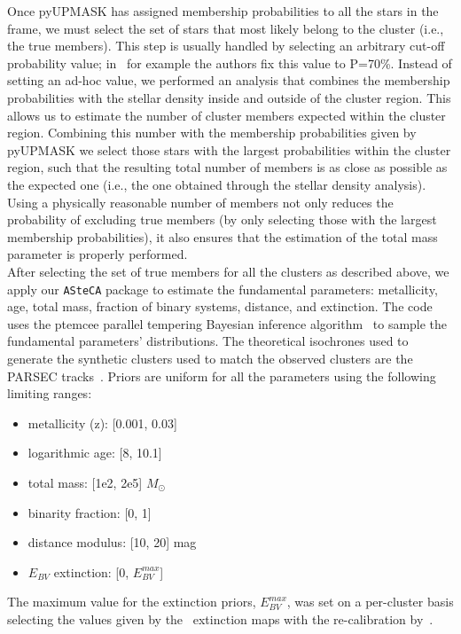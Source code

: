 \documentclass[draft]{aa}
\begin{document}
  Once pyUPMASK has assigned membership probabilities to all the stars in the
  frame, we must select the set of stars that most likely belong to the
  cluster (i.e., the true members). This step is usually handled by selecting
  an arbitrary cut-off probability value; in~\cite{Cantat_2020} for example
  the authors fix this value to P=70\%. Instead of setting an ad-hoc value, we
  performed an analysis that combines the membership probabilities with the
  stellar density inside and outside of the cluster region. This allows us to
  estimate the number of cluster members expected within the cluster region.
  Combining this number with the membership probabilities given by pyUPMASK we
  select those stars with the largest probabilities within the cluster region,
  such that the resulting total number of members is as close as possible as the
  expected one (i.e., the one obtained through the stellar density analysis).
  Using a physically reasonable number of members not only reduces the
  probability of excluding true members (by only selecting those with the
  largest membership probabilities), it also ensures that the estimation of the
  total mass parameter is properly performed.\\

  After selecting the set of true members for all the clusters as described
  above, we apply our \texttt{ASteCA} package to estimate the fundamental
  parameters: metallicity, age, total mass, fraction of binary systems,
  distance, and extinction. The code uses the ptemcee parallel tempering
  Bayesian inference algorithm~\citep{ptemcee} to sample the fundamental
  parameters' distributions. The theoretical isochrones used to generate the
  synthetic clusters used to match the observed clusters are the PARSEC
  tracks~\citep{Bressan_2012}. Priors are uniform for all the parameters using
  the following limiting ranges:

  \begin{itemize}
   \item metallicity (z): [0.001, 0.03]
   \item logarithmic age: [8, 10.1]
   \item total mass: [1e2, 2e5] $M_{\odot}$
   \item binarity fraction: [0, 1]
   \item distance modulus: [10, 20] mag
   \item $E_{BV}$ extinction: [0, $E_{BV}^{max}$]
  \end{itemize}

  \noindent The maximum value for the extinction priors, $E_{BV}^{max}$, was set
  on a per-cluster basis selecting the values given by the~\cite{Schlegel_1998}
  extinction maps with the re-calibration by~\cite{Schlafly_2011}.
  
\end{document}
